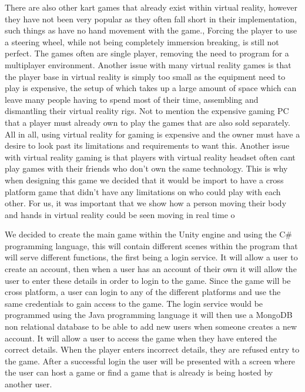 There are also other kart games that already exist within virtual reality, however they have not been very popular as they often fall short in their implementation, such things as have no hand movement with the game., Forcing the player to use a steering wheel, while not being completely immersion breaking, is still not perfect. The games often are single player, removing the need to program for a multiplayer environment. Another issue with many virtual reality games is that the player base in virtual reality is simply too small as the equipment need to play is expensive, the setup of which takes up a large amount of space which can leave many people having to spend most of their time, assembling and dismantling their virtual reality rigs. Not to mention the expensive gaming PC that a player must already own to play the games that are also sold separately. All in all, using virtual reality for gaming is expensive and the owner must have a desire to look past its limitations and requirements to want this. Another issue with virtual reality gaming is that players with virtual reality headset often cant play games with their friends who don't own the same technology. This is why when designing this game we decided that it would be import to have a cross platform game that didn't have any limitations on who could play with each other. For us, it was important that we show how a person moving their body and hands in virtual reality could be seen moving in real time o 
\newline

We decided to create the main game within the Unity engine and using the C# programming language, this will contain different scenes within the program that will serve different functions, the first being a login service. It will allow a user to create an account, then when a user has an account of their own it will allow the user to enter these details in order to login to the game. Since the game will be cross platform, a user can login to any of the different platforms and use the same credentials to gain access to the game. The login service would be programmed using the Java programming language it will then use a MongoDB non relational database to be able to add new users when someone creates a new account. It will allow a user to access the game when they have entered the correct details. When the player enters incorrect details, they are refused entry to the game. After a successful login the user will be presented with a screen where the user can host a game or find a game that is already is being hosted by another user.\newline  

